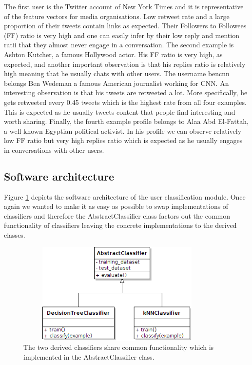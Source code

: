 \noindent The first user is the Twitter account of New York Times and it is representative of the feature vectors for media organisations. Low retweet rate and a large proportion of their tweets contain links as expected. Their Followers to Followees (FF) ratio is very high and one can easily infer by their low reply and mention ratii that they almost never engage in a conversation. The second example is Ashton Kutcher, a famous Hollywood actor. His FF ratio is very high, as expected, and another important observation is that his replies ratio is relatively high meaning that he usually chats with other users. The username bencnn belongs Ben Wedeman a famous American journalist working for CNN. An interesting observation is that his tweets are retweeted a lot. More specifically, he gets retweeted every 0.45 tweets which is the highest rate from all four examples. This is expected as he usually tweets content that people find interesting and worth sharing. Finally, the fourth example profile belongs to Alaa Abd El-Fattah, a well known Egyptian political activist. In his profile we can observe relatively low FF ratio but very high replies ratio which is expected as he usually engages in conversations with other users.

\subsection{Software architecture}
Figure \ref{Classifiers} depicts the software architecture of the user classification module. Once again we wanted to make it as easy as possible to swap implementations of classifiers and therefore
the AbstractClassifier class factors out the common functionality of classifiers leaving the concrete implementations to the derived classes. 

\begin{figure}[htbp]
  \begin{center}
    \includegraphics[height=2in, width=4in]{classifiers}
    \caption{The two derived classifiers share common functionality which is implemented in the AbstractClassifier class. }
    \label{Classifiers}
  \end{center}
\end{figure} 

